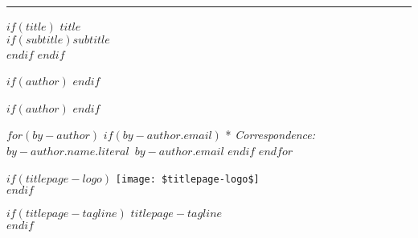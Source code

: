 
\thispagestyle{empty} %

\raggedleft %
\rule{1pt}{\textheight} %
\hspace{0.05\textwidth} %
\begin{minipage}[b][\textheight][s]{0.85\textwidth}

$if(title)$
{\titlepagetitlealign
{\large\bfseries\nohyphens{$title$}}\\[2\baselineskip] 
$if(subtitle)${\large\textit{$subtitle$}}\\[4\baselineskip]$endif$
}
$endif$

$if(author)$
{\titlepageauthoralign
{\titlepageauthorblock}
}
$endif$

\vspace{2\baselineskip} 

$if(author)$
{\titlepageaffiliationalign
\titlepageaffiliationblock
}
$endif$


\vspace{1\baselineskip} 

$for(by-author)$
$if(by-author.email)$
* \textit{Correspondence:}~$by-author.name.literal$~$by-author.email$
$endif$
$endfor$

\vfill

$if(titlepage-logo)$
\texttt{[image: \$titlepage-logo\$]}\\
$endif$

\vspace{0.1\textheight} 

$if(titlepage-tagline)$
{\noindent $titlepage-tagline$}\\[\baselineskip]
$endif$
\end{minipage}

